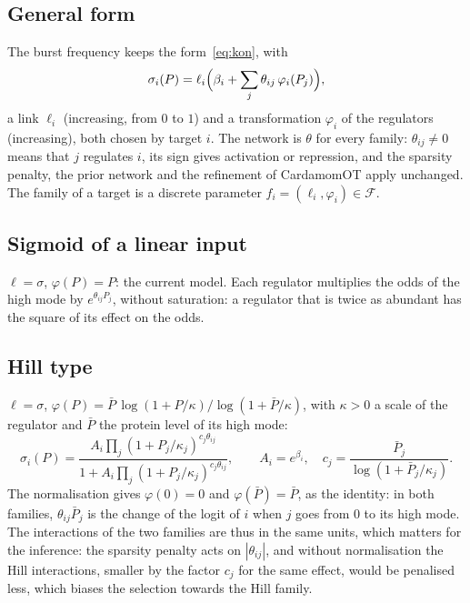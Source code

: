 \documentclass[a4paper, 11pt]{article}
\newcommand{\F}{\mathcal{F}}
\theoremstyle{plain}
\theoremstyle{remark}
\begin{document}
\subsection{General form}

The burst frequency keeps the form~\eqref{eq:kon}, with
\begin{equation}\label{eq:family}
\sigma_i(P) = \ell_i\Bigl(\beta_i + \sum_j \theta_{ij}\,\varphi_i(P_j)\Bigr),
\end{equation}
a link $\ell_i$ (increasing, from $0$ to $1$) and a transformation $\varphi_i$ of the regulators (increasing), both chosen by target $i$. The network is $\theta$ for every family: $\theta_{ij} \neq 0$ means that $j$ regulates $i$, its sign gives activation or repression, and the sparsity penalty, the prior network and the refinement of CardamomOT apply unchanged. The family of a target is a discrete parameter $f_i = (\ell_i, \varphi_i) \in \F$.

\subsection{Sigmoid of a linear input}

$\ell = \sigma$, $\varphi(P) = P$: the current model. Each regulator multiplies the odds of the high mode by $e^{\theta_{ij}P_j}$, without saturation: a regulator that is twice as abundant has the square of its effect on the odds.

\subsection{Hill type}

$\ell = \sigma$, $\varphi(P) = \bar P\,\log(1 + P/\kappa)/\log(1 + \bar P/\kappa)$, with $\kappa > 0$ a scale of the regulator and $\bar P$ the protein level of its high mode:
\begin{equation}\label{eq:hill}
\sigma_i(P) = \frac{A_i\prod_j (1 + P_j/\kappa_j)^{c_j\theta_{ij}}}{1 + A_i\prod_j (1 + P_j/\kappa_j)^{c_j\theta_{ij}}}, \qquad A_i = e^{\beta_i},\quad c_j = \frac{\bar P_j}{\log(1 + \bar P_j/\kappa_j)}.
\end{equation}
The normalisation gives $\varphi(0) = 0$ and $\varphi(\bar P) = \bar P$, as the identity: in both families, $\theta_{ij}\bar P_j$ is the change of the logit of $i$ when $j$ goes from $0$ to its high mode. The interactions of the two families are thus in the same units, which matters for the inference: the sparsity penalty acts on $|\theta_{ij}|$, and without normalisation the Hill interactions, smaller by the factor $c_j$ for the same effect, would be penalised less, which biases the selection towards the Hill family.
\end{document}
